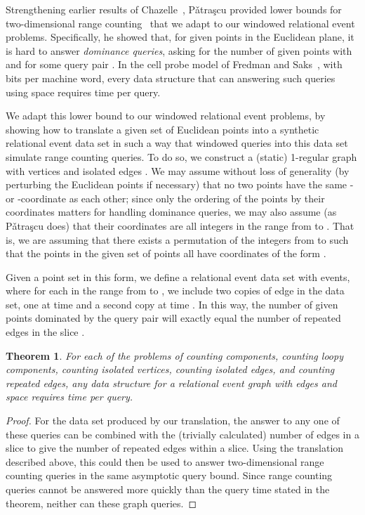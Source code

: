 \documentclass[11pt]{article}
\newtheorem{theorem}{Theorem}
\begin{document}
Strengthening earlier results of Chazelle~\cite{Cha-JACM-90},
P{\v a}tra{\c s}cu provided lower bounds for two-dimensional range counting~\cite{Pat-STOC-07} that we adapt to our windowed relational event problems. Specifically, he showed that, for  given points in the Euclidean plane, it is hard to answer \emph{dominance queries}, asking for the number of given points  with  and  for some query pair . In the cell probe model of Fredman and Saks~\cite{FreSak-STOC-89}, with  bits per machine word, every data structure that can answering such queries using space  requires  time per query.

We adapt this lower bound to our windowed relational event problems, by showing how to translate a given set of  Euclidean points into a synthetic relational event data set in such a way that windowed queries into this data set simulate range counting queries. To do so, we construct a (static) 1-regular graph with  vertices and  isolated edges . We may assume without loss of generality (by perturbing the Euclidean points if necessary) that no two points have the same - or -coordinate as each other; since only the ordering of the points by their coordinates matters for handling dominance queries, we may also assume (as P{\v a}tra{\c s}cu does) that their coordinates are all integers in the range from  to . That is, we are assuming that there exists a permutation  of the integers from  to  such that the points in the given set of points all have coordinates of the form .

Given a point set in this form, we define a relational event data set with  events, where for each  in the range from  to , we include two copies of edge  in the data set, one at time  and a second copy at time . In this way, the number of given points dominated by the query pair  will exactly equal the number of repeated edges in the slice .

\begin{theorem}
\label{thm:lb}
For each of the problems of counting components, counting loopy components, counting isolated vertices, counting isolated edges, and counting repeated edges, any data structure for a relational event graph with  edges and space  requires  time per query.
\end{theorem}

\begin{proof}
For the data set produced by our translation, the answer to any one of these queries can be combined with the (trivially calculated) number of edges in a slice to give the number of repeated edges within a slice. Using the translation described above, this could then be used to answer two-dimensional range counting queries in the same asymptotic query bound. Since range counting queries cannot be answered more quickly than the query time stated in the theorem, neither can these graph queries.
\end{proof}
\end{document}
